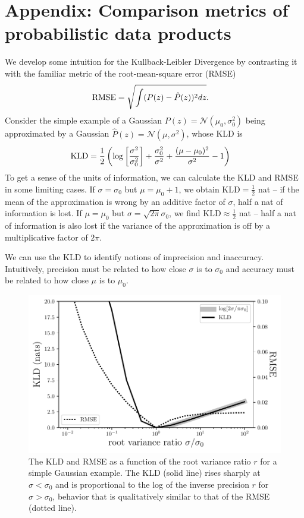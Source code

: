\chapter*{Appendix: Comparison metrics of probabilistic data products \label{chap:append}}



We develop some intuition for the Kullback-Leibler Divergence by contrasting it with the familiar metric of the root-mean-square error (RMSE)
\begin{align}
\eqlabel{eq:rmse}
\mathrm{RMSE} &= \sqrt{\int (P(z) - \hat{P}(z))^{2} dz}.
\end{align}
Consider the simple example of a Gaussian $P(z) = \mathcal{N}(\mu_{0}, 
\sigma_{0}^{2})$ being approximated by a Gaussian $\hat{P}(z) = 
\mathcal{N}(\mu, \sigma^{2})$, whose KLD is
\begin{align}
\eqlabel{eq:gaussian}
\mathrm{KLD} &= \frac{1}{2}\left(\log\left[\frac{\sigma^{2}}{\sigma_{0}^{2}}\right] + \frac{\sigma_{0}^{2}}{\sigma^{2}} + \frac{(\mu - \mu_{0})^{2}}{\sigma^{2}} - 1\right)
\end{align}
To get a sense of the units of information, we can calculate the KLD and RMSE in some limiting cases.
If $\sigma = \sigma_{0}$ but $\mu = \mu_{0}+1$, we obtain $\mathrm{KLD} = \frac{1}{2}$ nat -- if the mean of the approximation is wrong by an additive factor of $\sigma$, half a nat of information is lost.
If $\mu = \mu_{0}$ but $\sigma = \sqrt{2\pi}\sigma_{0}$, we find $\mathrm{KLD} \approx \frac{1}{2}$ nat -- half a nat of information is also lost if the variance of the approximation is off by a multiplicative factor of $2\pi$.

We can use the KLD to identify notions of imprecision and inaccuracy.
Intuitively, precision must be related to how close $\sigma$ is to $\sigma_{0}$ and accuracy must be related to how close $\mu$ is to $\mu_{0}$.

\begin{figure}
	\begin{center}
		\includegraphics[width=0.74\columnwidth]{figures/qp/precision.pdf}
		\caption{The KLD and RMSE as a function of the root variance ratio $r$ for a simple Gaussian example.
			The KLD (solid line) rises sharply at $\sigma < \sigma_{0}$ and is proportional to the log of the inverse precision $r$ for $\sigma > \sigma_{0}$, behavior that is qualitatively similar to that of the RMSE (dotted line).
			}
	\end{center}
\end{figure}

